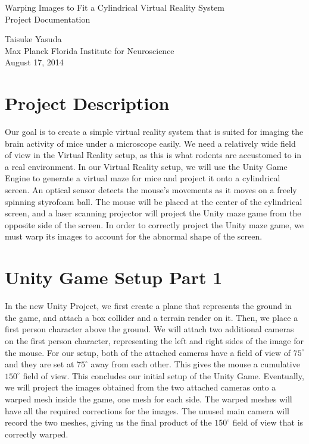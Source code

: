 \documentclass[a4paper]{article}
\begin{document}
\begin{center}
{\LARGE Warping Images to Fit a Cylindrical Virtual Reality System \\
\vspace{5mm}
Project Documentation} \\

\vspace{10mm}

Taisuke Yasuda \\
Max Planck Florida Institute for Neuroscience \\
August 17, 2014 \\
\end{center}

\section{Project Description}

Our goal is to create a simple virtual reality system that is suited for imaging the brain activity of mice under a microscope easily. We need a relatively wide field of view in the Virtual Reality setup, as this is what rodents are accustomed to in a real environment. In our Virtual Reality setup, we will use the Unity Game Engine to generate a virtual maze for mice and project it onto a cylindrical screen. An optical sensor detects the mouse’s movements as it moves on a freely spinning styrofoam ball. The mouse will be placed at the center of the cylindrical screen, and a laser scanning projector will project the Unity maze game from the opposite side of the screen. In order to correctly project the Unity maze game, we must warp its images to account for the abnormal shape of the screen. 
	
\section{Unity Game Setup Part 1}

In the new Unity Project, we first create a plane that represents the ground in the game, and attach a box collider and a terrain render on it. Then, we place a first person character above the ground. We will attach two additional cameras on the first person character, representing the left and right sides of the image for the mouse. For our setup, both of the attached cameras have a field of view of $75^\circ$ and they are set at $75^\circ$ away from each other. This gives the mouse a cumulative $150^\circ$ field of view. This concludes our initial setup of the Unity Game. Eventually, we will project the images obtained from the two attached cameras onto a warped mesh inside the game, one mesh for each side. The warped meshes will have all the required corrections for the images. The unused main camera will record the two meshes, giving us the final product of the $150^\circ$ field of view that is correctly warped. 
\end{document}
